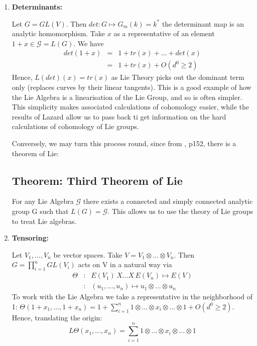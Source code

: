 \begin{enumerate}
    \item \textbf{Determinants:}

    Let $G=GL(V)$. Then $det:G\mapsto G_m(k) = k^*$ the
    determinant map is an analytic homomorphism.
    Take $x$ as a representative of an element $1+x\in \mathcal G
    = L(G)$. We have
    \begin{eqnarray}
    \nonumber det(1+x) &=& 1+ tr(x) + \dots + det(x) \\
    \nonumber          &=& 1+tr(x) + O(d^0\geq 2)
    \end{eqnarray}
    Hence, \emph{$L(det)(x) = tr(x)$} as Lie Theory picks out the
    dominant term only (replaces curves by their linear tangents).
    This is a good example of how the Lie Algebra is a
    linearisation of the Lie Group, and so is often simpler. This
    simplicity makes associated calculations of cohomology easier,
    while the results of Lazard allow us to pass back ti get
    information on the hard calculations of cohomology of Lie
    groups.

    Conversely, we may turn this process round, since from
    \cite{S2}, p152, there is a theorem of Lie:
    \subsection{Theorem: Third Theorem of Lie}\label{df2.5.5}
    For any Lie Algebra $\mathcal G$ there exists a connected and
    simply connected analytic group G such that $L(G)=\mathcal G$.
    This allows us to use the theory of Lie groups to treat Lie
    algebras.
    \item \textbf{Tensoring:}

    Let $V_1,\dots , V_n$ be vector spaces. Take
    $V=V_1\otimes\dots\otimes V_n$. Then $G=\prod_{i=1}^n GL(V_i)$
    acts on V in a natural way via
    \begin{eqnarray}
    \nonumber \Theta &:& E(V_1)\, X\dots X\, E(V_n)\mapsto E(V)\\
    \nonumber        &:& (u_1,\dots , u_n) \mapsto u_1\otimes
    \dots \otimes u_n
    \end{eqnarray}
    To work with the Lie Algebra we take a representative in the
    neighborhood of 1: $\Theta (1+x_1, \dots , 1+ x_n) = 1
    +\sum_{i=1}^n 1\otimes \dots \otimes x_i \otimes \dots \otimes
    1 +O(d^0\geq 2)$. Hence, translating the origin:
    $$L\Theta (x_1, \dots , x_n) = \sum_{i=1}^n 1\otimes \dots
    \otimes x_i\otimes \dots \otimes 1$$
\end{enumerate}








